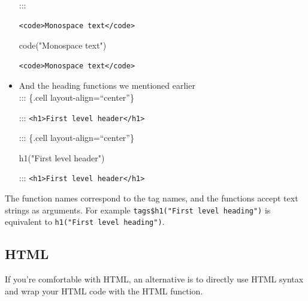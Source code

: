 \documentclass[
  letterpaper,
  DIV=11,
  numbers=noendperiod]{scrreprt}
\newenvironment{Shaded}{\begin{snugshade}}{\end{snugshade}}
\newcommand{\FunctionTok}[1]{\textcolor[rgb]{0.28,0.35,0.67}{#1}}
\newcommand{\NormalTok}[1]{\textcolor[rgb]{0.00,0.46,0.62}{#1}}
\newcommand{\SpecialCharTok}[1]{\textcolor[rgb]{0.37,0.37,0.37}{#1}}
\newcommand{\StringTok}[1]{\textcolor[rgb]{0.13,0.47,0.30}{#1}}
\begin{document}
\begin{itemize}
  :::

\begin{verbatim}
<code>Monospace text</code>
\end{verbatim}

\begin{Shaded}
\begin{Highlighting}[]
\FunctionTok{code}\NormalTok{(}\StringTok{"Monospace text"}\NormalTok{)}
\end{Highlighting}
\end{Shaded}

\begin{verbatim}
<code>Monospace text</code>
\end{verbatim}
\item
  And the heading functions we mentioned earlier\\
  ::: \{.cell layout-align=``center''\}

\begin{Shaded}
\end{Shaded}

  :::
  \texttt{\textless{}h1\textgreater{}First\ level\ header\textless{}/h1\textgreater{}}

  ::: \{.cell layout-align=``center''\}

\begin{Shaded}
\begin{Highlighting}[]
\FunctionTok{h1}\NormalTok{(}\StringTok{"First level header"}\NormalTok{)}
\end{Highlighting}
\end{Shaded}

  :::
  \texttt{\textless{}h1\textgreater{}First\ level\ header\textless{}/h1\textgreater{}}
\end{itemize}

The function names correspond to the tag names, and the functions accept
text strings as arguments. For example
\texttt{tags\$h1("First\ level\ heading")} is equivalent to
\texttt{h1("First\ level\ heading")}.

\hypertarget{html}{%
\subsection{HTML}\label{html}}

If you're comfortable with HTML, an alternative is to directly use HTML
syntax and wrap your HTML code with the HTML function.
\end{document}
